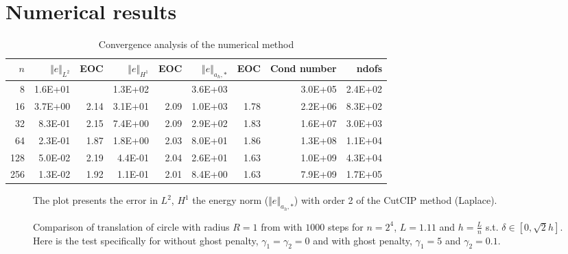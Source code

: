 
\newpage
\section{Numerical results}%
\label{sec:numerical_results}


\begin{table}[h!]
    \caption{Convergence analysis of the numerical method}
    \label{table:CutFEM_error1}
  \begin{tabular}{rrrrrrrrr}
    \hline\hline
    \textbf{$n$} & \textbf{$\Vert e \Vert_{L^2}$} & \textbf{EOC} & \textbf{$ \Vert e \Vert_{H^1}$} & \textbf{EOC} & \textbf{$\Vert e \Vert_{ a_h,* }$} & \textbf{EOC} & \textbf{Cond number} & \textbf{ndofs} \\\hline
    8 & 1.6E+01 &  & 1.3E+02 &  & 3.6E+03 &  & 3.0E+05 & 2.4E+02 \\
    16 & 3.7E+00 & 2.14 & 3.1E+01 & 2.09 & 1.0E+03 & 1.78 & 2.2E+06 & 8.3E+02 \\
    32 & 8.3E-01 & 2.15 & 7.4E+00 & 2.09 & 2.9E+02 & 1.83 & 1.6E+07 & 3.0E+03 \\
    64 & 2.3E-01 & 1.87 & 1.8E+00 & 2.03 & 8.0E+01 & 1.86 & 1.3E+08 & 1.1E+04 \\
    128 & 5.0E-02 & 2.19 & 4.4E-01 & 2.04 & 2.6E+01 & 1.63 & 1.0E+09 & 4.3E+04 \\
    256 & 1.3E-02 & 1.92 & 1.1E-01 & 2.01 & 8.4E+00 & 1.63 & 7.9E+09 & 1.7E+05 \\\hline\hline
  \end{tabular}

\end{table}

\begin{figure}[h!]
    \centering
    
    \caption{The plot presents the error in $L^2$, $H^1$ the energy norm ($\Vert e \Vert_{a_h,*}$) with order 2 of the CutCIP method (Laplace).}
    \label{fig:CutFEM_error1}
\end{figure}

\begin{figure}
    \centering
    \hfill
    \caption{Comparison of translation of circle with radius $R=1$ from with $1000$ steps for $n=2^4$, $L=1.11$ and $h=\frac{L}{n}$ s.t. $\delta \in  [0, \sqrt{2} h]  $. Here is the test specifically for without ghost penalty, $\gamma _{1} =
    \gamma_2=0 $ and with ghost penalty, $ \gamma _{1} = 5 $ and $\gamma _{2} = 0.1$.}
    \label{fig:combined}
\end{figure}



